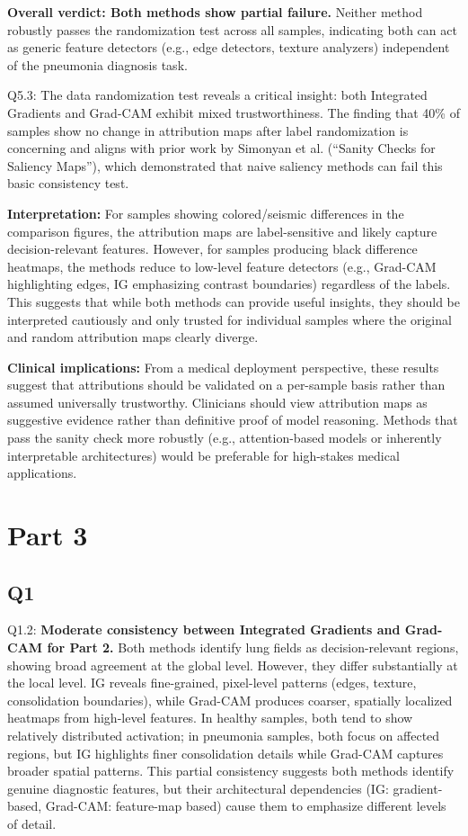 \textbf{Overall verdict: Both methods show partial failure.} Neither method robustly passes the randomization test across all samples, indicating both can act as generic feature detectors (e.g., edge detectors, texture analyzers) independent of the pneumonia diagnosis task.

Q5.3: The data randomization test reveals a critical insight: both Integrated Gradients and Grad-CAM exhibit mixed trustworthiness. The finding that 40\% of samples show no change in attribution maps after label randomization is concerning and aligns with prior work by Simonyan et al. (``Sanity Checks for Saliency Maps''), which demonstrated that naive saliency methods can fail this basic consistency test.

\textbf{Interpretation:} For samples showing colored/seismic differences in the comparison figures, the attribution maps are label-sensitive and likely capture decision-relevant features. However, for samples producing black difference heatmaps, the methods reduce to low-level feature detectors (e.g., Grad-CAM highlighting edges, IG emphasizing contrast boundaries) regardless of the labels. This suggests that while both methods can provide useful insights, they should be interpreted cautiously and only trusted for individual samples where the original and random attribution maps clearly diverge.

\textbf{Clinical implications:} From a medical deployment perspective, these results suggest that attributions should be validated on a per-sample basis rather than assumed universally trustworthy. Clinicians should view attribution maps as suggestive evidence rather than definitive proof of model reasoning. Methods that pass the sanity check more robustly (e.g., attention-based models or inherently interpretable architectures) would be preferable for high-stakes medical applications.

\section*{Part 3}
\subsection*{Q1}
Q1.2: \textbf{Moderate consistency between Integrated Gradients and Grad-CAM for Part 2.} Both methods identify lung fields as decision-relevant regions, showing broad agreement at the global level. However, they differ substantially at the local level. IG reveals fine-grained, pixel-level patterns (edges, texture, consolidation boundaries), while Grad-CAM produces coarser, spatially localized heatmaps from high-level features. In healthy samples, both tend to show relatively distributed activation; in pneumonia samples, both focus on affected regions, but IG highlights finer consolidation details while Grad-CAM captures broader spatial patterns. This partial consistency suggests both methods identify genuine diagnostic features, but their architectural dependencies (IG: gradient-based, Grad-CAM: feature-map based) cause them to emphasize different levels of detail.

